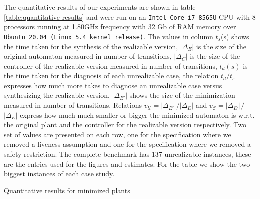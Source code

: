 The quantitative results of our experiments are shown in table 
\ref{table:quantitative-results} and were run on an 
\texttt{Intel\textsuperscript{\textregistered} Core\textsuperscript{\texttrademark}
 i7-8565U} CPU with 8 processors running at 1.80GHz frequency
with 32 Gb of RAM memory over \texttt{Ubuntu 20.04 (Linux 5.4 kernel release)}.
 The values in column $t_{s}$(s) shows the time taken for the synthesis of the realizable version, $|\Delta_E|$ is the size of the original automaton measured in number of transitions, $|\Delta_C|$ is the size of the controller of the realizable version measured in number of transitions, $t_{d}(s)$ is the time taken for the diagnosis of each unrealizable case, the relation $t_{d}/t_{s}$ expresses how much more takes to diagnose an unrealizable case versus synthesizing the realizable version, $|\Delta_{E'}|$ shows the size of the  minimization measured in number of transitions. Relations $v_{\mathcal{U}}$$=$$|\Delta_{E'}|$$/$$|\Delta_{E}|$ and $v_{\mathcal{C}}$$=$$|\Delta_{E'}|$$/$$|\Delta_{E}|$ express how much much smaller or bigger the minimized automaton is w.r.t. the original plant and the controller for the realizable version respectively. Two set of values are presented on each row, one for the specification where we removed a liveness assumption and one for the specification where we removed a safety restriction.
 The complete benchmark has 137 unrealizable instances, these are the entries used for the figures and estimates. 
For the table we show the two biggest instances of each case study.
\begin{table*}
	\footnotesize
	\resizebox{\textwidth}{!} {

}
	\normalsize
  \caption{Quantitative results for minimized plants}
  \label{table:quantitative-results}
  \vspace{-1em}
 \end{table*}
